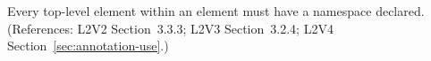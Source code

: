 Every top-level element within an  element must have a
namespace declared.  (References: L2V2 Section~3.3.3;
L2V3 Section~3.2.4; L2V4 Section~\ref{sec:annotation-use}.)
